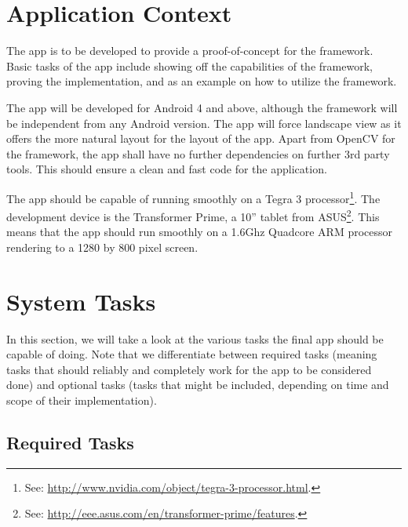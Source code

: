 \section{Application Context}

The app is to be developed to provide a proof-of-concept for the framework.
Basic tasks of the app include showing off the capabilities of the framework, proving the implementation, and as an example on how to utilize the framework.

The app will be developed for Android 4 and above, although the framework will be independent from any Android version.
The app will force landscape view as it offers the more natural layout for the layout of the app.
Apart from OpenCV for the framework, the app shall have no further dependencies on further 3rd party tools.
This should ensure a clean and fast code for the application.

The app should be capable of running smoothly on a Tegra 3 processor\footnote{See: \url{http://www.nvidia.com/object/tegra-3-processor.html}.}.
The development device is the Transformer Prime, a 10'' tablet from ASUS\footnote{See: \url{http://eee.asus.com/en/transformer-prime/features}.}.
This means that the app should run smoothly on a 1.6Ghz Quadcore ARM processor rendering to a 1280 by 800 pixel screen.

\section{System Tasks}

In this section, we will take a look at the various tasks the final app should be capable of doing.
Note that we differentiate between required tasks (meaning tasks that should reliably and completely work for the app to be considered done) and optional tasks (tasks that might be included, depending on time and scope of their implementation).

\subsection{Required Tasks}

